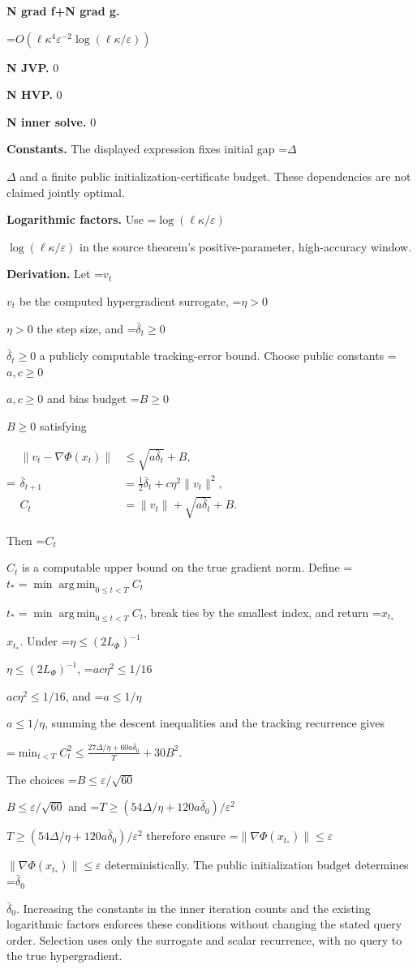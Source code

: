 \documentclass[10pt,a4paper]{article}
\newcommand{\AtlasMath}[1]{\par\begingroup\centering\setbox0=\hbox{$\displaystyle #1$}\ifdim\wd0>1.4\linewidth\typeout{ATLAS WIDE FORMULA: \the\wd0}\fi\ifdim\wd0>\linewidth\resizebox{\linewidth}{!}{\box0}\else\box0\fi\par\endgroup}
\newcommand{\AtlasInlineMath}[1]{\begingroup\setbox0=\hbox{$#1$}\ifdim\wd0>.4\linewidth\endgroup\AtlasMath{#1}\else\endgroup$#1$\fi}
\begin{document}
\textbf{N grad f+N grad g.}



\AtlasMath{O(\ell \kappa ^4\varepsilon ^{-2} \log(\ell \kappa /\varepsilon ))}


\textbf{N JVP.} 0



\textbf{N HVP.} 0



\textbf{N inner solve.} 0



\textbf{Constants.} The displayed expression fixes initial gap \AtlasInlineMath{\Delta} and a finite public initialization-certificate budget. These dependencies are not claimed jointly optimal.



\textbf{Logarithmic factors.} Use \AtlasInlineMath{\log(\ell\kappa/\varepsilon)} in the source theorem’s positive-parameter, high-accuracy window.



\textbf{Derivation.} Let \AtlasInlineMath{v_t} be the computed hypergradient surrogate, \AtlasInlineMath{\eta>0} the step size, and \AtlasInlineMath{\bar\delta_t\ge0} a publicly computable tracking-error bound. Choose public constants \AtlasInlineMath{a,c\ge0} and bias budget \AtlasInlineMath{B\ge0} satisfying

\AtlasMath{\begin{aligned}
\|v_t-\nabla\Phi(x_t)\|&\le\sqrt{a\bar\delta_t}+B,\\
\bar\delta_{t+1}&=\tfrac12\bar\delta_t+c\eta^2\|v_t\|^2,\\
C_t&=\|v_t\|+\sqrt{a\bar\delta_t}+B.
\end{aligned}}

Then \AtlasInlineMath{C_t} is a computable upper bound on the true gradient norm. Define \AtlasInlineMath{t_* = \min\operatorname*{arg\,min}_{0\le t<T} C_t}, break ties by the smallest index, and return \AtlasInlineMath{x_{t_*}}. Under \AtlasInlineMath{\eta\le(2L_\Phi)^{-1}}, \AtlasInlineMath{ac\eta^2\le1/16}, and \AtlasInlineMath{a\le1/\eta}, summing the descent inequalities and the tracking recurrence gives

\AtlasMath{\min_{t<T}C_t^2\le\frac{27\Delta/\eta+60a\bar\delta_0}{T}+30B^2.}

The choices \AtlasInlineMath{B\le\varepsilon/\sqrt{60}} and \AtlasInlineMath{T\ge(54\Delta/\eta+120a\bar\delta_0)/\varepsilon^2} therefore ensure \AtlasInlineMath{\|\nabla\Phi(x_{t_*})\|\le\varepsilon} deterministically. The public initialization budget determines \AtlasInlineMath{\bar\delta_0}. Increasing the constants in the inner iteration counts and the existing logarithmic factors enforces these conditions without changing the stated query order. Selection uses only the surrogate and scalar recurrence, with no query to the true hypergradient.
\end{document}
